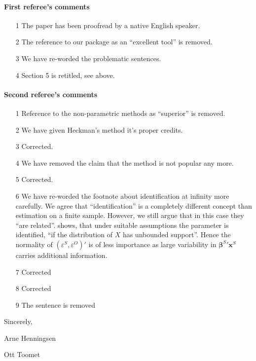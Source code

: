 \documentclass[a4paper]{article}
\renewcommand*{\vec}[1]{\boldsymbol{#1}}%
\begin{document}
\paragraph{First referee's comments}

\begin{itemize}
\item[1] The paper has been proofread by a native English speaker.
\item[2] The reference to our package as an ``excellent tool'' is removed.
\item[3] We have re-worded the problematic sentences.
\item[4] Section 5 is retitled, see above.
\end{itemize}

\paragraph{Second referee's comments}

\begin{itemize}
\item[1] Reference to the non-parametric methods as ``superior'' is
  removed.
\item[2] We have given Heckman's method it's proper credits.
\item[3] Corrected.
\item[4] We have removed the claim that the method is not popular any more.
\item[5] Corrected.
\item[6] We have re-worded the footnote about identification at
  infinity more carefully.  We agree that ``identification'' is a
  completely different concept than estimation on a finite sample.
  However, we still argue that in this case they ``are related''.
  \citet[p. 205]{chamberlain1986} shows, that under suitable
  assumptions the parameter is identified, ``if the distribution of
  $X$ has unbounded support''.  Hence the normality of
  $(\varepsilon^{S}, \varepsilon^{O})'$ is of less importance as large
  variability in ${\vec{\beta}^{S}}' \vec{x}^{S}$ carries additional
  information.
\item[7] Corrected
\item[8] Corrected
\item[9] The sentence is removed
\end{itemize}

\bigskip

Sincerely,

\bigskip

Arne Henningsen

Ott Toomet



\end{document}
